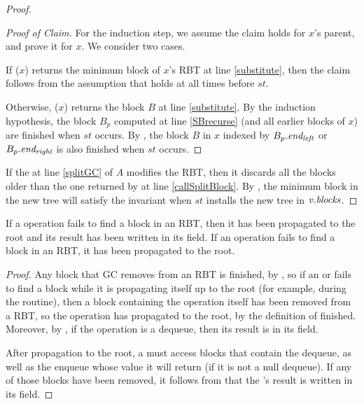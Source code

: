 \begin{proof}
\begin{proof}[Proof of Claim]
For the induction step, we assume the claim holds for $x$'s parent, and prove it for $x$.
We consider two cases.

If ($x$) returns the minimum block of $x$'s RBT at line \ref{substitute},
then the claim follows from the assumption that  holds at all times before $st$.

Otherwise, ($x$) returns the block $B$ at line \ref{substitute}.
By the induction hypothesis, the block $B_p$ computed at line \ref{SBrecurse}
(and all earlier blocks of $x$) are finished when $st$ occurs.
By , the block $B$ in $x$ indexed by $B_p.\mbox{\textit{end\textsubscript{left}}}$ or $B_p.\mbox{\textit{end\textsubscript{right}}}$
is also finished when $st$ occurs.
\renewcommand{\qedsymbol}{$\diamondsuit$}
\end{proof}

If the  at line \ref{splitGC} of $A$ modifies the RBT, then it discards
all the blocks older than the one returned by  at line \ref{callSplitBlock}.
By , the minimum block in the new tree will satisfy the invariant when $st$
installs the new tree in $\mbox{\textnormal{\textit{v}}}.\mbox{\textit{blocks}}$.
\end{proof}

\begin{lemma}\label{blocknotfound}
If a  operation fails to find a block in an RBT,
then it has been propagated to the root and its result has been written in its  field.
If an  operation fails to find a block in an RBT, it has been propagated to the root.
\end{lemma}
\begin{proof}
Any block that GC removes from an RBT is finished, by , so if an 
 or  fails to find a block while it is propagating itself up to
the root (for example, during the  routine), then a block containing
the operation itself has been removed from a RBT, so the operation has propagated to the root,
by the definition of finished.
Moreover, by , if the operation is a dequeue, then its result is in its  field.

After propagation to the root, a  must access blocks that contain the dequeue,
as well as the enqueue whose value it will return (if it is not a null dequeue).
If any of those blocks have been removed, it follows from  that the
's result is written in its  field.
\end{proof}


